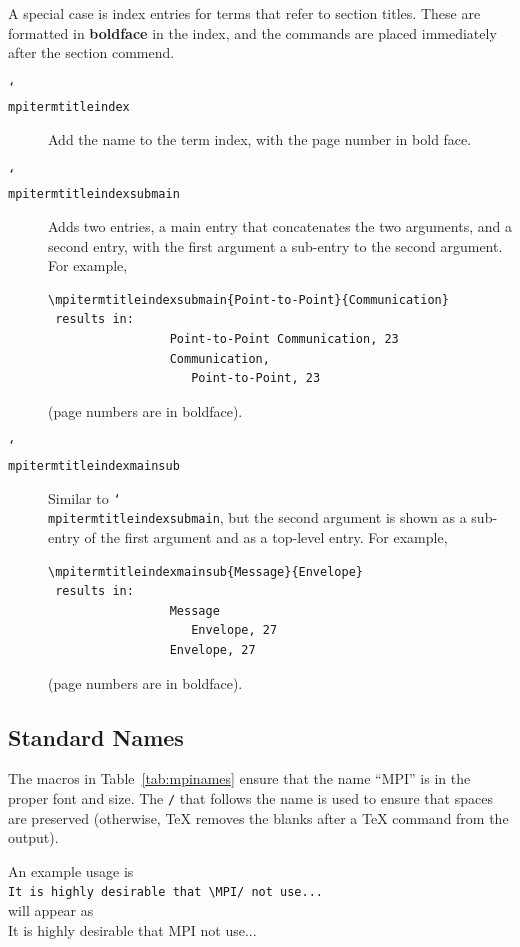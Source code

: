 \documentclass[letterpaper,twoside,11pt,fleqn]{article}
\def\cmd#1{\texttt{\char`\\#1}}
\def\MPI/{\textsf{MPI}}    %
\begin{document}
A special case is index entries for terms that refer to section
titles.
These are formatted in \textbf{boldface} in the index, and the
commands are placed immediately after the section commend.
\begin{description}
\item[\cmd{mpitermtitleindex}]Add the name to the term index, with the
  page number in bold face.
\item[\cmd{mpitermtitleindexsubmain}]Adds two entries, a main entry
  that concatenates the two arguments, and a second entry, with the
  first argument a sub-entry to the second argument.
For example,
\begin{verbatim}
\mpitermtitleindexsubmain{Point-to-Point}{Communication}
 results in:
                 Point-to-Point Communication, 23
                 Communication,
                    Point-to-Point, 23
\end{verbatim}
(page numbers are in boldface).
\item[\cmd{mpitermtitleindexmainsub}]Similar to
  \cmd{mpitermtitleindexsubmain}, but the second argument is shown as a
  sub-entry of the first argument and as a top-level entry.
For example,
\begin{verbatim}
\mpitermtitleindexmainsub{Message}{Envelope}
 results in:
                 Message
                    Envelope, 27
                 Envelope, 27
\end{verbatim}
(page numbers are in boldface).
\end{description}

\subsection{Standard Names}
\label{sec:standard-names}

The macros in Table~\ref{tab:mpinames} ensure that the name ``MPI'' is
in the proper font and size.
The \verb+/+ that follows the name is used to ensure that spaces are
preserved (otherwise, TeX removes the blanks after a TeX command from
the output).

An example usage is\\
\verb+It is highly desirable that \MPI/ not use...+\\
will appear as\\
It is highly desirable that \MPI/ not use...
\end{document}
